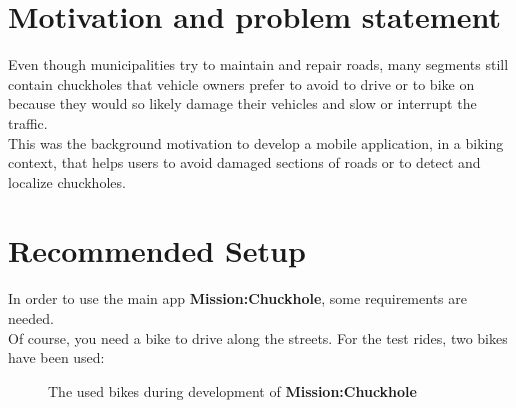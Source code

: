 \documentclass[10pt,a4paper]{article} %
\begin{document}
    \pagestyle{plain}
    \title{\rmfamily\normalfont{}}
    \author{}
    \date{} %
    
    \maketitle
    


    \tableofcontents
    


    \section{Motivation and problem statement}

	

Even though municipalities try to maintain and repair roads, many segments still contain chuckholes that vehicle owners prefer to avoid to drive or to bike on because they would so likely damage their vehicles and slow or interrupt the traffic.\\
This was the background motivation to develop a mobile application, in a biking context, that helps users to avoid damaged sections of roads or to detect and localize chuckholes.

    \section{Recommended Setup}

	In order to use the main app \textbf{Mission:Chuckhole}, some requirements are needed.\\
	Of course, you need a bike to drive along the streets.
	For the test rides, two bikes have been used:

	\begin{figure}[H]
	  \centering
	  \hfill
	  \caption{The used bikes during development of \textbf{Mission:Chuckhole}}
	  \label{fig:onboarding}
	\end{figure}
\end{document}
